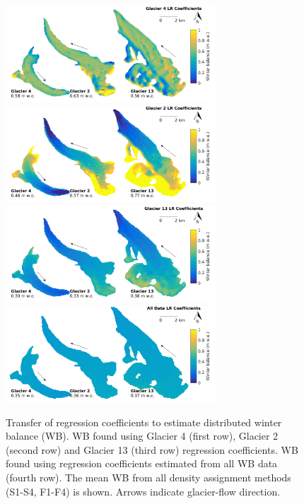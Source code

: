 \documentclass{sfuthesis}
\begin{document}
\begin{figure}[H]
	\centering
	\includegraphics[width =0.7\textwidth]{MapTransferabilityG4Coeffs.png}\\
	\includegraphics[width =0.7\textwidth]{MapTransferabilityG2Coeffs.png}\\
	\includegraphics[width =0.7\textwidth]{MapTransferabilityG13Coeffs.png}\\	
	\includegraphics[width =0.7\textwidth]{MapTransferabilityComboCoeffs.png}\\
	\caption[Transfer of regression coefficients to estimate distributed winter balance]{Transfer of regression coefficients to estimate distributed winter balance (WB). WB found using Glacier 4 (first row), Glacier 2 (second row) and Glacier 13 (third row) regression coefficients. WB found using regression coefficients estimated from all WB data (fourth row). The mean WB from all density assignment methods (S1-S4, F1-F4) is shown. Arrows indicate glacier-flow direction.}
	\label{fig:MapTransferabilityGlaciersMean}
\end{figure}
\end{document}
